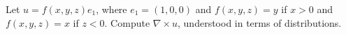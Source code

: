 Let $u=f(x,y,z)e_1$, where $e_1=(1,0,0)$ and $f(x,y,z)=y$ if $x>0$ and
$f(x,y,z)=x$ if $z<0$. Compute $\nabla \times u$, understood in terms
of distributions.

